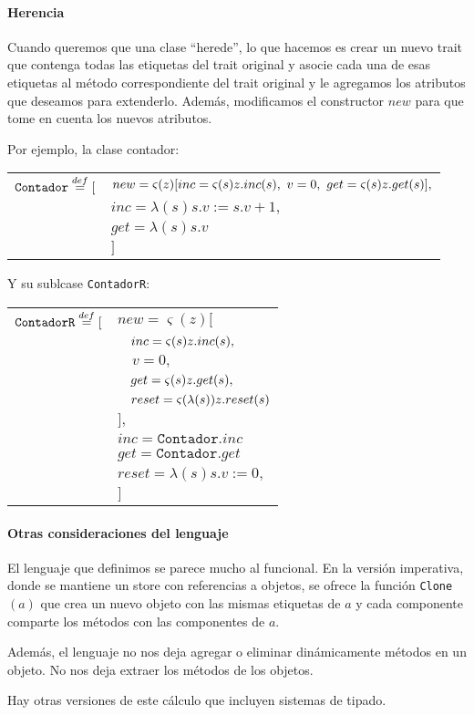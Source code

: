 \paragraph{Herencia} Cuando queremos que una clase ``herede'', lo que hacemos es crear un nuevo trait que contenga todas las etiquetas del trait original y asocie cada una de esas etiquetas al método correspondiente del trait original y le agregamos los atributos que deseamos para extenderlo. Además, modificamos el constructor $new$ para que tome en cuenta los nuevos atributos.

Por ejemplo, la clase contador:

\vspace*{5mm}
\begin{tabular}{ll}
$\texttt{Contador}\overset{def}{=} [$ &
$new = \varsigma(z)[inc = \varsigma(s)z.inc(s),~v = 0,~ get = \varsigma(s)z.get(s) ],$ \\
 & $inc = \lambda(s) s.v := s.v + 1,$ \\
 & $get = \lambda(s) s.v$ \\
  & $]$ \\
\end{tabular}

Y su sublcase \texttt{ContadorR}:

\vspace*{5mm}
\begin{tabular}{ll}
$\texttt{ContadorR}\overset{def}{=} [$ &
$new = \varsigma(z)[$
\\ & $\quad inc = \varsigma(s)z.inc(s),$ \\ 
 & $\quad v = 0,$ \\
 & $\quad get = \varsigma(s)z.get(s),$ \\
 & $\quad reset = \varsigma(\lambda(s))z.reset(s) $ \\
 & $ ],$ \\
& $inc = \texttt{Contador}.inc$ \\
& $get = \texttt{Contador}.get$ \\
& $reset = \lambda(s) s.v := 0,$ \\
& $]$ \\
\end{tabular}


\paragraph{Otras consideraciones del lenguaje}
El lenguaje que definimos se parece mucho al funcional. En la versión imperativa, donde se mantiene un store con referencias a objetos, se ofrece la función \texttt{Clone}$(a)$ que crea un nuevo objeto con las mismas etiquetas de $a$ y cada componente comparte los métodos con las componentes de $a$.

Además, el lenguaje no nos deja agregar o eliminar dinámicamente métodos en un objeto. No nos deja extraer los métodos de los objetos.

Hay otras versiones de este cálculo que incluyen sistemas de tipado.